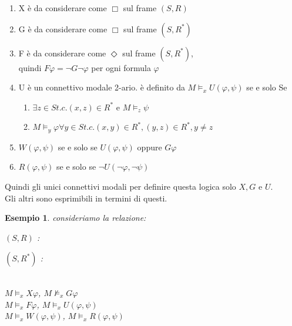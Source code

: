 \documentclass[a4paper,12pt]{article}
\theoremstyle{def}
\theoremstyle{prop}
\theoremstyle{esempio}
\newtheorem*{example}{Esempio}
\theoremstyle{dimostrazione}
\theoremstyle{teo}
\theoremstyle{osservazione}
\begin{document}
\begin{enumerate}
	\item X è da considerare come \(\Box\) sul frame \((S,R)\)
	\item G è da considerare come \(\Box\) sul frame \((S,R^*)\)
	\item F è da considerare come \(\Diamond\) sul frame \((S,R^*)\),\\
	      quindi \(F \varphi = \neg G \neg \varphi\) per ogni formula \(\varphi\)
	\item U è un connettivo modale 2-ario. è definito da
	      \(M \vDash_x U(\varphi, \psi)\) se e solo Se
	      \begin{enumerate}
		      \item \(\exists z \in S t.c. (x,z) \in R^*\) e \(M \vDash_z \psi\)
		      \item \(M \vDash_y \varphi \forall y \in S t.c. (x,y) \in R^*, (y,z) \in R^*, y \neq z\)
	      \end{enumerate}
	\item \(W(\varphi, \psi)\) se e solo se \(U(\varphi, \psi)\) oppure \(G \varphi\)
	\item \(R(\varphi, \psi)\) se e solo se \(\neg U(\neg \varphi, \neg \psi)\)
\end{enumerate}
Quindi gli unici connettivi modali per definire questa logica solo \(X, G\) e \(U\).\\
Gli altri sono esprimibili in termini di questi.
\begin{example}
	consideriamo la relazione:
	\begin{center}
		\((S,R)\) :
		\((S,R^*)\) :
		\\

		\(M \vDash_x X \varphi\), \(M \nvDash_x G \varphi\)\\
		\(M \vDash_x F \varphi\), \(M \vDash_x U(\varphi, \psi)\)\\
		\(M \vDash_x W(\varphi, \psi)\), \(M \vDash_x R(\varphi, \psi)\)
	\end{center}
\end{example}
\end{document}
